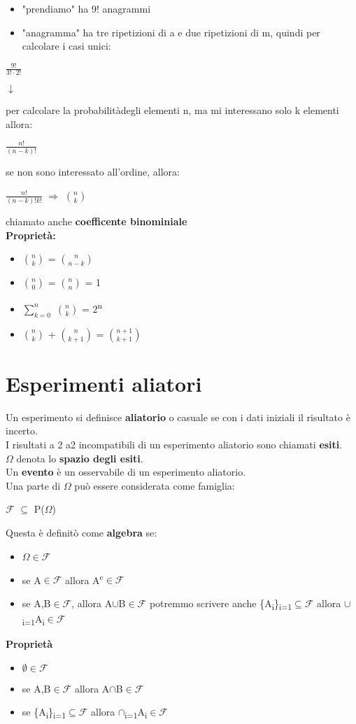 \documentclass[12pt, letterpaper]{article}
\def\SPSB#1#2{\rlap{\textsuperscript{#1}}\SB{#2}}
\def\SP#1{\textsuperscript{#1}}
\def\SB#1{\textsubscript{#1}}
\begin{document}
\begin{itemize}
    \item "prendiamo" ha 9! anagrammi
    \item "anagramma" ha tre ripetizioni di a e due ripetizioni di m, quindi per calcolare i casi unici:   
\end{itemize}
\begin{center}
    \Large $\frac{9!}{3!{\cdot}2!}$

    $\downarrow$
 \end{center} 
per calcolare la probabilitàdegli elementi n, ma mi interessano solo k elementi allora:
\begin{center}
    \Large $\frac{n!}{(n-k)!}$
\end{center}
se non sono interessato all'ordine, allora:
\begin{center}
    \Large $\frac{n!}{(n-k)!k!}$ $\Rightarrow$ $\binom{n}{k}$ 
\end{center}
chiamato anche \textbf{coefficente binominiale}
\\
\textbf{Proprietà:}
\begin{itemize}
    \item $\binom{n}{k}$ = $\binom{n}{n-k}$
    \item $\binom{n}{0}$ = $\binom{n}{n}$ = 1
    \item $\sum_{k=0}^{n}$ $\binom{n}{k}$  = 2\SP{n}
    \item $\binom{n}{k}$ + $\binom{n}{k+1}$ = $\binom{n+1}{k+1}$  
\end{itemize}

\section{Esperimenti aliatori}

Un esperimento si definisce \textbf{aliatorio} o casuale se con i dati iniziali il risultato è incerto.
\\
I risultati a 2 a2 incompatibili di un esperimento aliatorio sono chiamati \textbf{esiti}.
\\
$\Omega$ denota lo \textbf{spazio degli esiti}.
\\
Un \textbf{evento} è un osservabile di un esperimento aliatorio.
\\
Una parte di $\Omega$ può essere considerata come famiglia:
\begin{center}
    $\mathcal{F}$ $\subseteq$ P($\Omega$)
\end{center}
Questa è definitò come \textbf{algebra} se:
\begin{itemize}
    \item $\Omega$$\in$$\mathcal{F}$
    \item se A$\in$$\mathcal{F}$ allora A\SP{c}$\in$$\mathcal{F}$
    \item se A,B$\in$$\mathcal{F}$, allora A$\cup$B$\in$$\mathcal{F}$
    \subitem potremmo scrivere anche \{A\SB{i}\}\SPSB{n}{i=1}$\subseteq$$\mathcal{F}$ allora $\cup$\SPSB{n}{i=1}A\SB{i}$\in$$\mathcal{F}$
\end{itemize}

\large\textbf{Proprietà}
\begin{itemize}
    \item $\emptyset$$\in$$\mathcal{F}$
    \item se A,B$\in$$\mathcal{F}$ allora A$\cap$B$\in$$\mathcal{F}$
    \item se \{A\SB{i}\}\SPSB{n}{i=1}$\subseteq$$\mathcal{F}$ allora $\cap$\SPSB{n}{i=1}A\SB{i}$\in$$\mathcal{F}$
\end{itemize}
\end{document}
